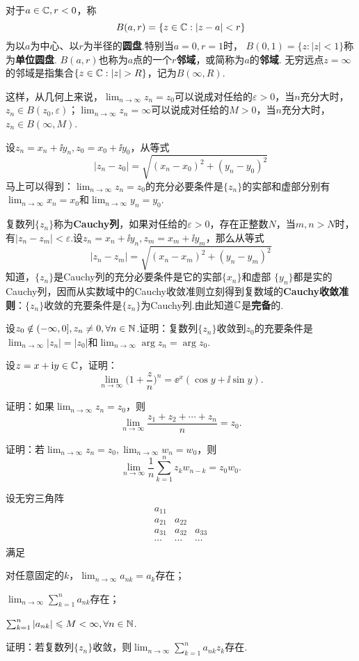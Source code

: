 对于$a\in\mathbb C,r<0$，称
\[B(a,r)=\{z\in\mathbb C:|z-a|<r\}\]
为以$a$为中心、以$r$为半径的\textbf{圆盘}.特别当$a=0,r=1$时， $B(0,1)=\{z:|z|<1\}$称为\textbf{单位圆盘}. $B(a,r)$也称为$a$点的一个\textbf{$r$邻域}，或简称为$a$的\textbf{邻域}. 无穷远点$z=\infty$的邻域是指集合$\{z\in\MC:|z|>R\}$，记为$B(\infty,R)$.

这样，从几何上来说，$\lim_{n\to\infty}z_n=z_0$可以说成对任给的$\varepsilon>0$，当$n$充分大时，$z_n\in B(z_0,\varepsilon)$；$\lim_{n\to\infty}z_n=\infty$可以说成对任给的$M>0$，当$n$充分大时，$z_n\in B(\infty,M)$.

设$z_n=x_n+\ii y_n,z_0=x_0+\ii y_0$，从等式
\[
  |z_n - z_0| = \sqrt{(x_n-x_0)^2 + (y_n-y_0)^2}
\]
马上可以得到：$\lim_{n\to\infty}z_n=z_0$的充分必要条件是$\{z_n\}$的实部和虚部分别有$\lim_{n\to\infty}x_n=x_0$和$\lim_{n\to\infty}y_n=y_0$.

复数列$\{z_n\}$称为\textbf{Cauchy列}，如果对任给的$\varepsilon>0$，存在正整数$N$，当$m,n>N$时，有$|z_n-z_m|<\varepsilon$.设$z_n=x_n+\ii y_n,z_m=x_m+\ii y_m$，那么从等式
\[
  |z_n-z_m| = \sqrt{(x_n-x_m)^2+(y_n-y_m)^2}
\]
知道，$\{z_n\}$是Cauchy列的充分必要条件是它的实部$\{x_n\}$和虚部
$\{y_n\}$都是实的Cauchy列，因而从实数域中的Cauchy收敛准则立刻得到复数域的\textbf{Cauchy收敛准则}：$\{z_n\}$收敛的充要条件是$\{z_n\}$为Cauchy列.由此知道$\mathbb C$是\textbf{完备}的.

\begin{xiti}
  \item 设$z_0\notin(-\infty,0],z_n\ne0,\forall n\in\mathbb N$.证明：复数列$\{z_n\}$收敛到$z_0$的充要条件是$\lim_{n\to\infty}|z_n|=|z_0|$和$\lim_{n\to\infty}\arg z_n=\arg z_0$.
  \item 设$z=x+\mathrm i y\in\mathbb C$，证明：
     \[
       \lim_{n\to\infty} \bigg( 1+\frac zn \bigg)^n = \ee^x(\cos y + \ii\sin y).
     \]
  \item 证明：如果$\lim_{n\to\infty}z_n=z_0$，则
     \[
       \lim_{n\to\infty} \frac{z_1 + z_2 + \cdots + z_n}n = z_0.
     \]
  \item 证明：若$\lim_{n\to\infty}z_n=z_0,\lim_{n\to\infty}w_n=w_0$，则
     \[
       \lim_{n\to\infty} \frac1n\sum_{k=1}^nz_kw_{n-k} = z_0w_0.
     \]
  \item 设无穷三角阵
     \[
       \begin{matrix}
         a_{11} &\\
         a_{21} & a_{22}\\
         a_{31} & a_{32} & a_{33}\\
         \cdots & \cdots & \cdots
       \end{matrix}
     \]
  满足
  \begin{enuma}
    \item 对任意固定的$k$，$\lim_{n\to\infty}a_{nk}=a_k$存在；
    \item $\lim_{n\to\infty}\sum_{k=1}^na_{nk}$存在；
    \item $\sum_{k=1}^n|a_{nk}|\leqslant M<\infty,\forall n\in \mathbb N$.
  \end{enuma}
  证明：若复数列$\{z_n\}$收敛，则$\lim_{n\to\infty}\sum_{k=1}^na_{nk}z_k$存在.
\end{xiti}

